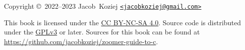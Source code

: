 %


\thispagestyle{empty}

\begingroup
\begin{small}
	\noindent
	Copyright \copyright\ 2022--2023 Jacob~Koziej \texttt{\href{%
	mailto:jacobkoziej@gmail.com}{<jacobkoziej@gmail.com>}}

	\vspace{1em}

	\noindent
	This book is licensed under the \href{https://creativecommons.%
	org/licenses/by-nc-sa/4.0/}{CC BY-NC-SA 4.0}.  Source code is
	distributed under the \href{https://www.gnu.org/licenses/gpl-3.%
	0.html}{GPLv3} or later.  Sources for this book can be found at
	\url{https://github.com/jacobkoziej/zoomer-guide-to-c}.
\end{small}
\endgroup

\cleardoublepage
